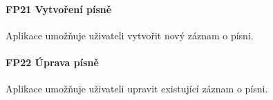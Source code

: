 \noindent \begin{minipage}{\textwidth}
    \paragraph{FP21 Vytvoření písně} \label{FP21}
    \begin{smallindent}{}
        Aplikace umožňuje uživateli vytvořit nový záznam o písni.
    \end{smallindent}
\end{minipage}

\noindent \begin{minipage}{\textwidth}
    \paragraph{FP22 Úprava písně} \label{FP22}
    \begin{smallindent}{}
        Aplikace umožňuje uživateli upravit existující záznam o písni.
    \end{smallindent}
\end{minipage}
